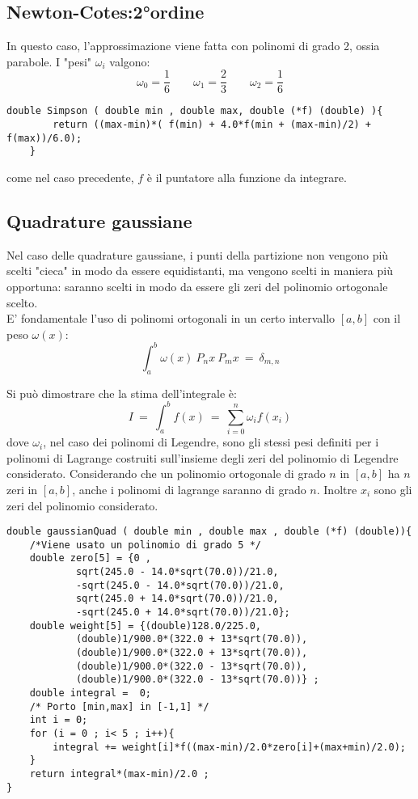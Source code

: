 \subsection*{Newton-Cotes:2°ordine}
In questo caso, l'approssimazione viene fatta con polinomi di grado 2, ossia parabole.
I "pesi" $\omega_i$ valgono:
$$
	\omega_0 = \frac{1}{6} \qquad  \omega_1 = \frac{2}{3} \qquad \omega_2 = \frac{1}{6}
$$
\begin{verbatim}
double Simpson ( double min , double max, double (*f) (double) ){
		return ((max-min)*( f(min) + 4.0*f(min + (max-min)/2) + f(max))/6.0);
	}
\end{verbatim}
come nel caso precedente, $f$ è il puntatore alla funzione da integrare.
\subsection*{Quadrature gaussiane}
Nel caso delle quadrature gaussiane, i punti della partizione non vengono più scelti
"cieca" in modo da essere equidistanti, ma vengono scelti in maniera più opportuna: saranno scelti in modo da essere gli zeri
del polinomio ortogonale scelto.\\
E' fondamentale l'uso di polinomi ortogonali in un certo intervallo $[a,b]$ con il peso $\omega(x)$:
$$
	\int_a^b \omega(x)\ P_n{x} \ P_m{x} \ = \ \delta_{m,n}
$$

Si può dimostrare che la stima dell'integrale è:
$$
 I \ = \  \int_a^b f(x) \ = \ \sum_{i=0}^n \omega_i f(x_i)
$$
dove $\omega_i$, nel caso dei polinomi di Legendre, sono gli stessi pesi definiti per i polinomi di Lagrange costruiti sull'insieme degli zeri
del polinomio di Legendre considerato. Considerando che un polinomio ortogonale di grado $n$ in $[a,b]$ ha $n$ zeri in $[a,b]$, anche i polinomi
di lagrange saranno di grado $n$. Inoltre $x_i$ sono gli zeri del polinomio considerato.
\begin{verbatim}
double gaussianQuad ( double min , double max , double (*f) (double)){
	/*Viene usato un polinomio di grado 5 */
	double zero[5] = {0 ,
			sqrt(245.0 - 14.0*sqrt(70.0))/21.0,
			-sqrt(245.0 - 14.0*sqrt(70.0))/21.0,
			sqrt(245.0 + 14.0*sqrt(70.0))/21.0,
			-sqrt(245.0 + 14.0*sqrt(70.0))/21.0};
	double weight[5] = {(double)128.0/225.0,
			(double)1/900.0*(322.0 + 13*sqrt(70.0)),
			(double)1/900.0*(322.0 + 13*sqrt(70.0)),
			(double)1/900.0*(322.0 - 13*sqrt(70.0)),
			(double)1/900.0*(322.0 - 13*sqrt(70.0))} ;
	double integral =  0;
	/* Porto [min,max] in [-1,1] */
	int i = 0;
	for (i = 0 ; i< 5 ; i++){
		integral += weight[i]*f((max-min)/2.0*zero[i]+(max+min)/2.0);
	}
	return integral*(max-min)/2.0 ;
}
\end{verbatim}

